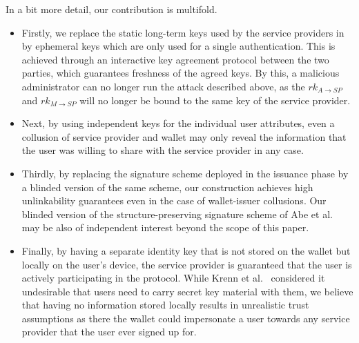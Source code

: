\documentclass[runningheads]{llncs}
\begin{document}
In a bit more detail, our contribution is multifold.
\begin{itemize}
\item
Firstly, we replace the static long-term keys used by the service providers in \cite{towardsEABC} by ephemeral keys which are only used for a single authentication.
This is achieved through an interactive key agreement protocol between the two parties, which guarantees freshness of the agreed keys.
By this, a malicious administrator can no longer run the attack described above, as the $rk_{A\to SP}$ and $rk_{M\to SP}$ will no longer be bound to the same key of the service provider.
\item
Next, by using independent keys for the individual user attributes, even a collusion of service provider and wallet may only reveal the information that the user was willing to share with the service provider in any case.
\item 
Thirdly, by replacing the signature scheme deployed in the issuance phase by a blinded version of the same scheme, our construction achieves high unlinkability guarantees even in the case of wallet-issuer collusions.
Our blinded version of the structure-preserving signature scheme of Abe et al.~\cite{AGHO:2011} may be also of independent interest beyond the scope of this paper.
\item
Finally, by having a separate identity key that is not stored on the wallet but locally on the user's device, the service provider is guaranteed that the user is actively participating in the protocol.
While Krenn et al.~\cite{towardsEABC} considered it undesirable that users need to carry secret key material with them, we believe that having no information stored locally results in unrealistic trust assumptions as there the wallet could impersonate a user towards any service provider that the user ever signed up for. 
\end{itemize}
\end{document}

